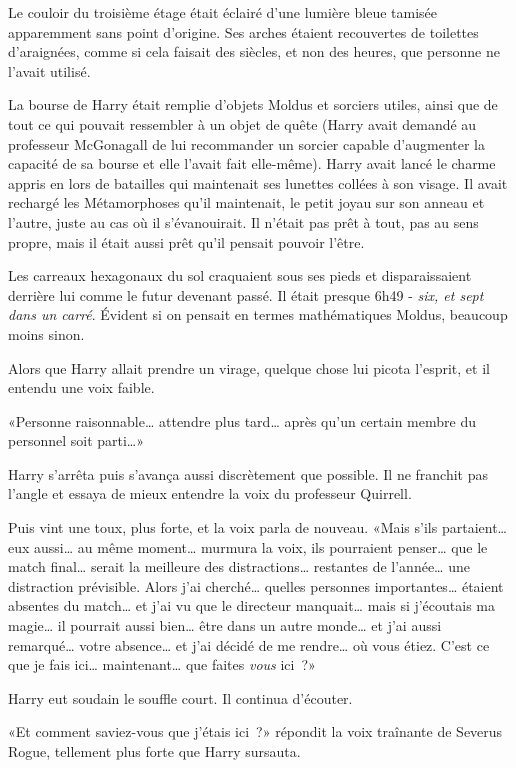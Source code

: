 Le couloir du troisième étage était éclairé d'une lumière bleue tamisée apparemment sans point d'origine. Ses arches étaient recouvertes de toilettes d'araignées, comme si cela faisait des siècles, et non des heures, que personne ne l'avait utilisé.

La bourse de Harry était remplie d'objets Moldus et sorciers utiles, ainsi que de tout ce qui pouvait ressembler à un objet de quête (Harry avait demandé au professeur McGonagall de lui recommander un sorcier capable d'augmenter la capacité de sa bourse et elle l'avait fait elle-même). Harry avait lancé le charme appris en lors de batailles qui maintenait ses lunettes collées à son visage. Il avait rechargé les Métamorphoses qu'il maintenait, le petit joyau sur son anneau et l'autre, juste au cas où il s'évanouirait. Il n'était pas prêt à tout, pas au sens propre, mais il était aussi prêt qu'il pensait pouvoir l'être.

Les carreaux hexagonaux du sol craquaient sous ses pieds et disparaissaient derrière lui comme le futur devenant passé. Il était presque 6h49 - \emph{six, et sept dans un carré}. Évident si on pensait en termes mathématiques Moldus, beaucoup moins sinon.

Alors que Harry allait prendre un virage, quelque chose lui picota l'esprit, et il entendu une voix faible.

«Personne raisonnable… attendre plus tard… après qu'un certain membre du personnel soit parti…»

Harry s'arrêta puis s'avança aussi discrètement que possible. Il ne franchit pas l'angle et essaya de mieux entendre la voix du professeur Quirrell.

Puis vint une toux, plus forte, et la voix parla de nouveau. «Mais s'ils partaient… eux aussi… au même moment… murmura la voix, ils pourraient penser… que le match final… serait la meilleure des distractions… restantes de l'année… une distraction prévisible. Alors j'ai cherché… quelles personnes importantes… étaient absentes du match… et j'ai vu que le directeur manquait… mais si j'écoutais ma magie… il pourrait aussi bien… être dans un autre monde… et j'ai aussi remarqué… votre absence… et j'ai décidé de me rendre… où vous étiez. C'est ce que je fais ici… maintenant… que faites \emph{vous} ici~?»

Harry eut soudain le souffle court. Il continua d'écouter.

«Et comment saviez-vous que j'étais ici~?» répondit la voix traînante de Severus Rogue, tellement plus forte que Harry sursauta.

